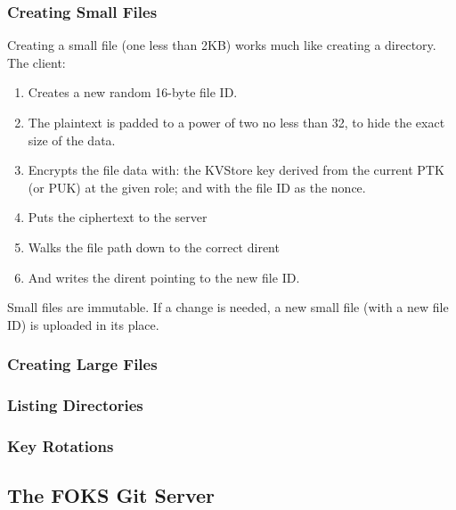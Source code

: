 \subsubsection{Creating Small Files}

Creating a small file (one less than 2KB) works much like creating a directory. The client:
%
\begin{enumerate}
    \item Creates a new random 16-byte file ID. 
    \item The plaintext is padded to a power of two no less than 32, to hide the exact size of the data.
    \item Encrypts the file data with: the KVStore key derived from the 
         current PTK (or PUK) at the given role; and with the file ID as the nonce.
    \item Puts the ciphertext to the server
    \item Walks the file path down to the correct dirent
    \item And writes the dirent pointing to the new file ID.
\end{enumerate}
%
Small files are immutable. If a change is needed,
a new small file (with a new file ID) is uploaded in its place.


\subsubsection{Creating Large Files}

\subsubsection{Listing Directories}

\subsubsection{Key Rotations}


\subsection{The FOKS Git Server}
